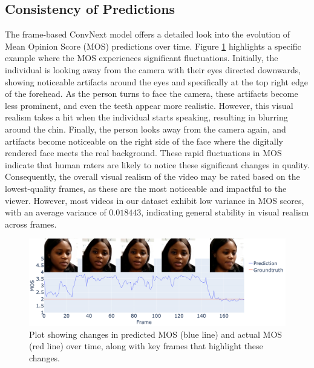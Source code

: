 \documentclass[a4paper,12pt,openright]{book}
\begin{document}
\subsection{Consistency of Predictions}
The frame-based ConvNext model offers a detailed look into the evolution of Mean Opinion Score (MOS) predictions over time. Figure \ref{fig:MOS_changes} highlights a specific example where the MOS experiences significant fluctuations. Initially, the individual is looking away from the camera with their eyes directed downwards, showing noticeable artifacts around the eyes and specifically at the top right edge of the forehead. As the person turns to face the camera, these artifacts become less prominent, and even the teeth appear more realistic. However, this visual realism takes a hit when the individual starts speaking, resulting in blurring around the chin. Finally, the person looks away from the camera again, and artifacts become noticeable on the right side of the face where the digitally rendered face meets the real background. These rapid fluctuations in MOS indicate that human raters are likely to notice these significant changes in quality. Consequently, the overall visual realism of the video may be rated based on the lowest-quality frames, as these are the most noticeable and impactful to the viewer. However, most videos in our dataset exhibit low variance in MOS scores, with an average variance of \(0.018443\), indicating general stability in visual realism across frames.



\begin{figure}[H]
\centering
\includegraphics[trim={0.5cm 0cm 20cm 0cm},clip,width=1.0\textwidth]{images/mos_time.png}
\caption{Plot showing changes in predicted MOS (blue line) and actual MOS (red line) over time, along with key frames that highlight these changes.}
\label{fig:MOS_changes}
\end{figure}

\newpage
\end{document}
